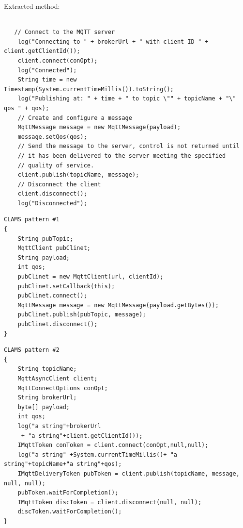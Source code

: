 
Extracted method:
\begin{lstlisting}

   // Connect to the MQTT server
    log("Connecting to " + brokerUrl + " with client ID " + client.getClientId());
    client.connect(conOpt);
    log("Connected");
    String time = new Timestamp(System.currentTimeMillis()).toString();
    log("Publishing at: " + time + " to topic \"" + topicName + "\" qos " + qos);
    // Create and configure a message
    MqttMessage message = new MqttMessage(payload);
    message.setQos(qos);
    // Send the message to the server, control is not returned until
    // it has been delivered to the server meeting the specified
    // quality of service.
    client.publish(topicName, message);
    // Disconnect the client
    client.disconnect();
    log("Disconnected");
 \end{lstlisting}

\noindent

\begin{minipage}[t]{0.4\textwidth}
\begin{lstlisting}
CLAMS pattern #1
{
    String pubTopic;
    MqttClient pubClinet;
    String payload;
    int qos;
    pubClinet = new MqttClient(url, clientId);
    pubClinet.setCallback(this);
    pubClinet.connect();
    MqttMessage message = new MqttMessage(payload.getBytes());
    pubClinet.publish(pubTopic, message);
    pubClinet.disconnect();
}
\end{lstlisting}
\end{minipage}
\hfill

\begin{minipage}[t]{0.5\textwidth}
\begin{lstlisting}
CLAMS pattern #2
{
    String topicName;
    MqttAsyncClient client;
    MqttConnectOptions conOpt;
    String brokerUrl;
    byte[] payload;
    int qos;
    log("a string"+brokerUrl
     + "a string"+client.getClientId());
    IMqttToken conToken = client.connect(conOpt,null,null);
    log("a string" +System.currentTimeMillis()+ "a string"+topicName+"a string"+qos);
    IMqttDeliveryToken pubToken = client.publish(topicName, message, null, null);
    pubToken.waitForCompletion();
    IMqttToken discToken = client.disconnect(null, null);
    discToken.waitForCompletion();
}

\end{lstlisting}
\end{minipage}

